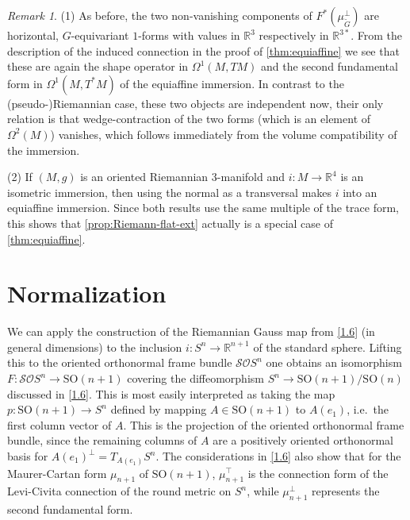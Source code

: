 \documentclass[british,11pt,a4paper]{amsart}
\numberwithin{equation}{section}
\renewcommand\Bbb{\mathbb}
\newcommand\Cal{\mathcal}
\newcommand{\Om}{\Omega}
\newcommand*{\R}{\mathbb{R}}
\newcounter{theorem}
\numberwithin{theorem}{section}
\theoremstyle{definition}
\theoremstyle{remark}
\newtheorem{remark}[theorem]{Remark}
\begin{document}
\begin{remark}\label{rem:equi-aff}
(1) As before, the two non-vanishing components of $F^*(\mu_{\widetilde G}^\perp)$ are horizontal, $G$-equivariant $1$-forms with values in $\R^3$ respectively in $\Bbb R^{3*}$. From the description of the induced connection in the proof of \cref{thm:equiaffine} we see that these are again the shape operator in $\Om^1(M,TM)$ and the second fundamental form in $\Om^1(M,T^*M)$ of the equiaffine immersion. In contrast to the (pseudo-)Riemannian case, these two objects are independent now, their only relation is that wedge-contraction of the two forms (which is an element of $\Om^2(M)$) vanishes, which follows immediately from the volume compatibility of the immersion.

(2) If $(M,g)$ is an oriented Riemannian $3$-manifold and $i:M\to\Bbb
  R^4$ is an isometric immersion, then using the normal as a transversal makes $i$
  into an equiaffine immersion. Since both results use the same multiple of the
  trace form, this shows that \cref{prop:Riemann-flat-ext} actually is a special case of
  \cref{thm:equiaffine}.
\end{remark}

\appendix

\section{Normalization}\label{Appendix}

 We can apply the construction of the Riemannian Gauss map from
  \cref{1.6} (in general dimensions) to the inclusion $i:S^n\to\Bbb R^{n+1}$ of the
  standard sphere. Lifting this to the oriented orthonormal frame bundle
  $\Cal{SO}S^n$ one obtains an isomorphism $F:\Cal{SO}S^n\to \mathrm{SO}(n+1)$
  covering the diffeomorphism $S^n\to\mathrm{SO}(n+1)/\mathrm{SO}(n)$ discussed in
  \cref{1.6}. This is most easily interpreted as taking the map
  $p:\mathrm{SO}(n+1)\to S^n$ defined by mapping $A\in\mathrm{SO}(n+1)$ to $A(e_1)$,
  i.e.~the first column vector of $A$. This is the projection of the oriented
  orthonormal frame bundle, since the remaining columns of $A$ are a positively
  oriented orthonormal basis for $A(e_1)^\perp=T_{A(e_1)}S^n$. The considerations in
  \cref{1.6} also show that for the Maurer-Cartan form $\mu_{n+1}$ of
  $\mathrm{SO}(n+1)$, $\mu_{n+1}^\top$ is the connection form of the Levi-Civita
  connection of the round metric on $S^n$, while $\mu_{n+1}^\perp$ represents the
  second fundamental form.
\end{document}
